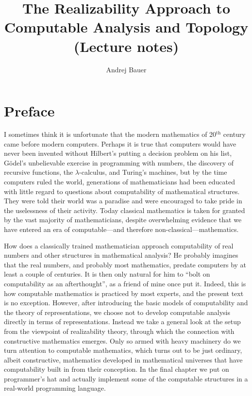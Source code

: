 \documentclass[11pt,a4paper,twoside]{book}
\begin{document}
\title{
  The Realizability Approach to\\
  Computable Analysis and Topology\\
  (Lecture notes)
}

\author{Andrej Bauer}

\maketitle


\chapter*{Preface}

I sometimes think it is unfortunate that the modern mathematics of
20${}^{\text{th}}$ century came before modern computers. Perhaps it is
true that computers would have never been invented without Hilbert's
putting a decision problem on his list, G\"odel's unbelievable
exercise in programming with numbers, the discovery of recursive
functions, the $\lambda$-calculus, and Turing's machines, but by the
time computers ruled the world, generations of mathematicians had been
educated with little regard to questions about computability of
mathematical structures. They were told their world was a paradise and
were encouraged to take pride in the uselessness of their activity.
Today classical mathematics is taken for granted by the vast majority
of mathematicians, despite overwhelming evidence that we have entered
an era of computable---and therefore non-classical---mathematics.

How does a classically trained mathematician approach computability of
real numbers and other structures in mathematical analysis? He
probably imagines that the real numbers, and probably most
mathematics, predate computers by at least a couple of centuries. It
is then only natural for him to ``bolt on computability as an
afterthought'', as a friend of mine once put it. Indeed, this is how
computable mathematics is practiced by most experts, and the present
text is no exception. However, after introducing the basic models of
computability and the theory of representations, we choose not to
develop computable analysis directly in terms of representations.
Instead we take a general look at the setup from the viewpoint of
realizability theory, through which the connection with constructive
mathematics emerges. Only so armed with heavy machinery do we turn
attention to computable mathematics, which turns out to be just
ordinary, albeit constructive, mathematics developed in mathematical
universes that have computability built in from their conception. In
the final chapter we put on programmer's hat and actually implement
some of the computable structures in a real-world programming
language.
\end{document}
